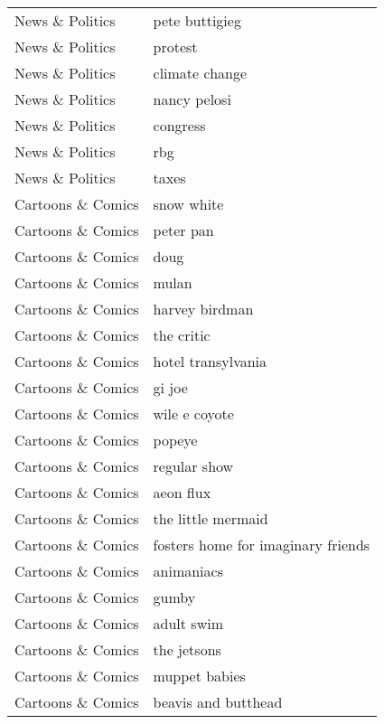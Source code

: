 \begin{supertabular}{l p{0.25\textwidth}}
  News \& Politics &                     pete buttigieg \\
  News \& Politics &                            protest \\
  News \& Politics &                     climate change \\
  News \& Politics &                       nancy pelosi \\
  News \& Politics &                           congress \\
  News \& Politics &                                rbg \\
  News \& Politics &                              taxes \\
Cartoons \& Comics &                         snow white \\
Cartoons \& Comics &                          peter pan \\
Cartoons \& Comics &                               doug \\
Cartoons \& Comics &                              mulan \\
Cartoons \& Comics &                     harvey birdman \\
Cartoons \& Comics &                         the critic \\
Cartoons \& Comics &                 hotel transylvania \\
Cartoons \& Comics &                             gi joe \\
Cartoons \& Comics &                      wile e coyote \\
Cartoons \& Comics &                             popeye \\
Cartoons \& Comics &                       regular show \\
Cartoons \& Comics &                          aeon flux \\
Cartoons \& Comics &                 the little mermaid \\
Cartoons \& Comics & fosters home for imaginary friends \\
Cartoons \& Comics &                         animaniacs \\
Cartoons \& Comics &                              gumby \\
Cartoons \& Comics &                         adult swim \\
Cartoons \& Comics &                        the jetsons \\
Cartoons \& Comics &                      muppet babies \\
Cartoons \& Comics &                beavis and butthead \\

\end{supertabular}
